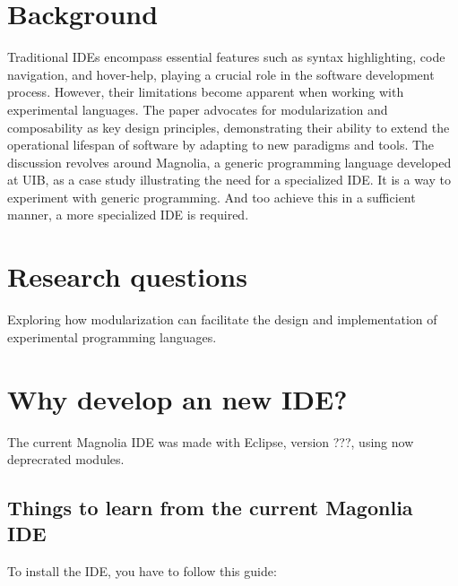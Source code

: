 \documentclass[runningheads]{llncs}
\begin{document}
\section{Background}

Traditional IDEs encompass essential features such as syntax highlighting, code
navigation, and hover-help, playing a crucial role in the software development
process. However, their limitations become apparent when working with
experimental languages.
The paper advocates for modularization and composability
as key design principles, demonstrating their ability to extend the operational
lifespan of software by adapting to new paradigms and tools. The discussion
revolves around Magnolia, a generic programming language developed at UIB, as a
case study illustrating the need for a specialized IDE. It is a way to
experiment with generic programming. And too achieve this in a sufficient
manner, a more specialized IDE is required.

\section{Research questions}

Exploring how modularization can facilitate the design and implementation of
experimental programming languages.

\section{Why develop an new IDE?}
The current Magnolia IDE was made with Eclipse, version ???, using now
deprecrated modules. %

\subsection{Things to learn from the current Magonlia IDE}
To install the IDE, you have to follow this guide:
\end{document}
